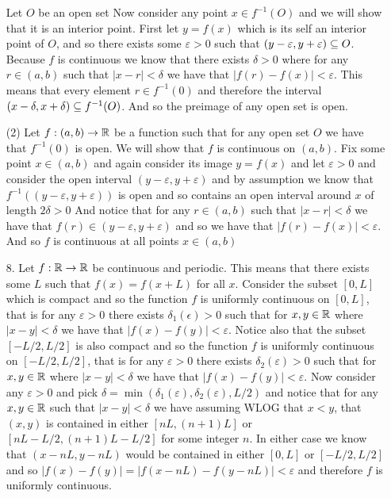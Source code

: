 \documentclass[12pt]{amsart}
\begin{document}
\begin{itemize}
               Let $O$ be an open set%
               Now consider any point $x\in f^{-1}(O)$ and we will show that it is an interior point. First let $y=f(x)$
               which is its self an interior point of $O$, and so there exists some $\varepsilon>0$ 
               such that $(y-\varepsilon, y+\varepsilon)\subseteq O$. Because $f$ is continuous we know that there exists $\delta>0$ 
               where for any $r\in (a,b)$ such that $|x-r|<\delta$ we have that $|f(r)-f(x)|<\varepsilon$. This means that every element $r\in f^{-1}(0)$
               and therefore the interval $(x-\delta,x+\delta)\subseteq f^{-1}(O)$. %
                And so the preimage of any open set is open.
               

               (2) Let $f:(a,b)\rightarrow\mathbb{R}$ be a function such that for any open set $O$ we have that $f^{-1}(0)$ is open.
               We will show that $f$ is continuous on $(a,b)$. Fix some point $x\in (a,b)$ and again consider its image $y=f(x)$ and let 
               $\varepsilon>0$ and consider the open interval $(y-\varepsilon, y+\varepsilon)$ and by assumption we know that 
               $f^{-1}((y-\varepsilon, y+\varepsilon))$ is open and so contains an open interval around $x$ of length $2\delta>0$
               And notice that for any $r\in (a,b)$ such that $|x-r|<\delta$ we have that $f(r)\in(y-\varepsilon, y+\varepsilon)$ and so
               we have that $|f(r)-f(x)|<\varepsilon$. And so $f$ is continuous at all points $x\in(a,b)$


    \item[8.] Let $f:\mathbb{R}\rightarrow \mathbb{R}$ be continuous and periodic. This means that there exists some $L$ such that $f(x)=f(x+L)$ for all $x$. 
    Consider the subset $[0,L]$ which is compact and so the function $f$ is uniformly continuous on $[0,L]$, that is for any 
    $\varepsilon>0$ there exists $\delta_1(\epsilon)>0$ such that for $x,y\in\mathbb{R}$ where $|x-y|<\delta$ we have that $|f(x)-f(y)|<\varepsilon$.
    Notice also that the subset $[-L/2,L/2]$ is also compact and so the function $f$ is uniformly continuous on $[-L/2,L/2]$, that is for any 
    $\varepsilon>0$ there exists $\delta_2(\varepsilon)>0$ such that for $x,y\in\mathbb{R}$ where $|x-y|<\delta$ we have that $|f(x)-f(y)|<\varepsilon$. 
    Now consider any $\varepsilon >0$ and pick $\delta=\min(\delta_1(\varepsilon),\delta_2(\varepsilon), L/2)$ and notice that for any $x,y\in\mathbb{R}$ such that $|x-y|<\delta$
    we have assuming WLOG that $x<y$, that $(x,y)$ is contained in either $[nL,(n+1)L]$ or $[nL-L/2,(n+1)L-L/2]$ for some integer $n$. 
    In either case we know that $(x-nL,y-nL)$ would be contained in either $[0,L]$ or $[-L/2,L/2]$ and so $|f(x)-f(y)|=|f(x-nL)-f(y-nL)|<\varepsilon$ and therefore 
    $f$ is uniformly continuous.



\end{itemize}
\end{document}
